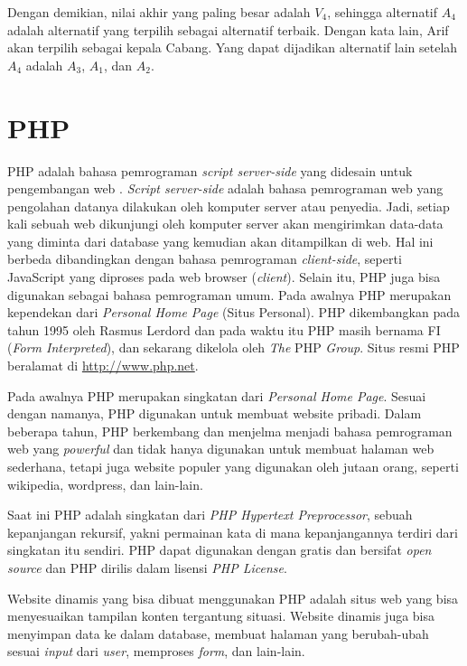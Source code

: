 Dengan demikian, nilai akhir yang paling besar adalah $V_{4}$, sehingga alternatif $A_{4}$ adalah alternatif yang terpilih sebagai alternatif terbaik. Dengan kata lain, Arif akan terpilih sebagai kepala Cabang. Yang dapat dijadikan alternatif lain setelah $A_{4}$ adalah $A_{3}$, $A_{1}$, dan $A_{2}$.


\section{PHP}
\label{sec:php}

PHP adalah bahasa pemrograman \textit{script server-side} yang didesain untuk pengembangan web \cite{php2}.  \textit{Script server-side} adalah bahasa pemrograman web yang pengolahan datanya dilakukan oleh komputer server atau penyedia. Jadi, setiap kali sebuah web dikunjungi oleh komputer server akan mengirimkan data-data yang diminta dari database yang kemudian akan ditampilkan di web. Hal ini berbeda dibandingkan dengan bahasa pemrograman \textit{client-side}, seperti JavaScript yang diproses pada web browser (\textit{client}). Selain itu, PHP juga bisa digunakan sebagai bahasa pemrograman umum. Pada awalnya PHP merupakan kependekan dari \textit{Personal Home Page} (Situs Personal). PHP dikembangkan pada tahun 1995 oleh Rasmus Lerdord dan pada waktu itu PHP masih bernama FI (\textit{Form Interpreted}), dan sekarang dikelola oleh \textit{The} PHP \textit{Group}. Situs resmi PHP beralamat di \url{http://www.php.net}.
	
	Pada awalnya PHP merupakan singkatan dari \textit{Personal Home Page}. Sesuai dengan namanya, PHP digunakan untuk membuat website pribadi. Dalam beberapa tahun, PHP berkembang dan menjelma menjadi bahasa pemrograman web yang \textit{powerful} dan tidak hanya digunakan untuk membuat halaman web sederhana, tetapi juga website populer yang digunakan oleh jutaan orang, seperti wikipedia, wordpress, dan lain-lain.
	
	Saat ini PHP adalah singkatan dari \textit{PHP Hypertext Preprocessor}, sebuah kepanjangan rekursif, yakni permainan kata di mana kepanjangannya terdiri dari singkatan itu sendiri. PHP dapat digunakan dengan gratis dan bersifat \textit{open source} dan PHP dirilis dalam lisensi \textit{PHP License}.
	
	Website dinamis yang bisa dibuat menggunakan PHP adalah situs web yang bisa menyesuaikan tampilan konten tergantung situasi. Website dinamis juga bisa menyimpan data ke dalam database, membuat halaman yang berubah-ubah sesuai \textit{input} dari \textit{user}, memproses \textit{form}, dan lain-lain.
	
